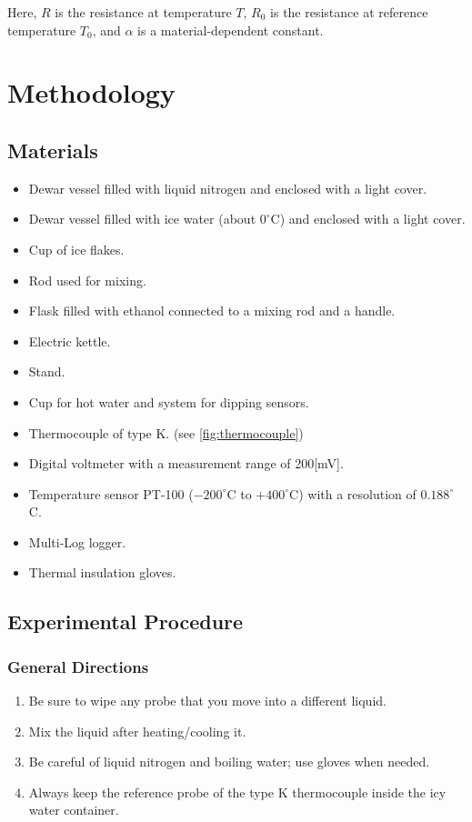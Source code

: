 \documentclass[12pt,a4paper]{report}
\begin{document}
Here, $R$ is the resistance at temperature $T$, $R_0$ is the resistance at reference temperature $T_0$, and $\alpha$ is a material-dependent constant.

 
\section{Methodology}
\subsection{Materials}
\begin{itemize}[leftmargin=2em]
    \item Dewar vessel filled with liquid nitrogen and enclosed with a light cover.
    \item Dewar vessel filled with ice water (about $0^\circ$C) and enclosed with a light cover.
    \item Cup of ice flakes.
    \item Rod used for mixing.
    \item Flask filled with ethanol connected to a mixing rod and a handle.
    \item Electric kettle.
    \item Stand.
    \item Cup for hot water and system for dipping sensors.
    \item Thermocouple of type K. (see \ref{fig:thermocouple})
    \item Digital voltmeter with a measurement range of 200[mV].
    \item Temperature sensor PT-100 ($-200^\circ$C to $+400^\circ$C) with a resolution of $0.188^\circ$C.
    \item Multi-Log logger.
    \item Thermal insulation gloves.
\end{itemize} 

\subsection{Experimental Procedure}
\subsubsection{General Directions}
\begin{enumerate}
    \item Be sure to wipe any probe that you move into a different liquid.
    \item Mix the liquid after heating/cooling it.
    \item Be careful of liquid nitrogen and boiling water; use gloves when needed.
    \item Always keep the reference probe of the type K thermocouple inside the icy water container.
\end{enumerate}
\end{document}
